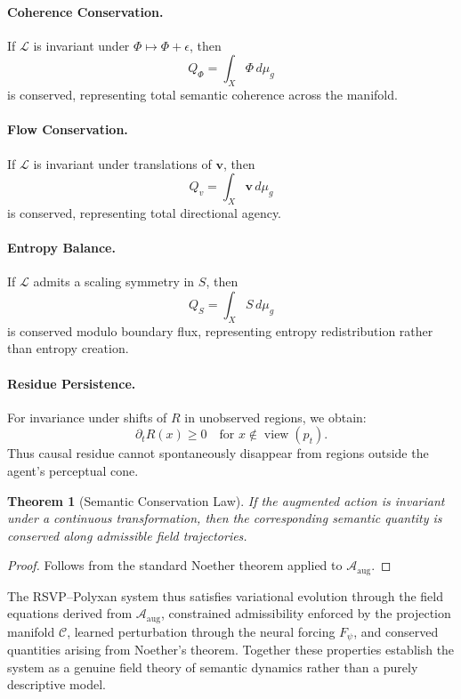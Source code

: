 \documentclass[11pt]{article}
\newtheorem{theorem}{Theorem}[section]
\begin{document}
\paragraph{Coherence Conservation.}
If $\mathcal{L}$ is invariant under $\Phi \mapsto \Phi + \epsilon$, then
\[
Q_\Phi = \int_X \Phi\, d\mu_g
\]
is conserved, representing total semantic coherence across the manifold.

\paragraph{Flow Conservation.}
If $\mathcal{L}$ is invariant under translations of $\mathbf{v}$, then
\[
Q_v = \int_X \mathbf{v}\, d\mu_g
\]
is conserved, representing total directional agency.

\paragraph{Entropy Balance.}
If $\mathcal{L}$ admits a scaling symmetry in $S$, then
\[
Q_S = \int_X S\, d\mu_g
\]
is conserved modulo boundary flux, representing entropy redistribution
rather than entropy creation.

\paragraph{Residue Persistence.}
For invariance under shifts of $R$ in unobserved regions, we obtain:
\[
\partial_t R(x) \ge 0 \quad \text{for } x \notin \operatorname{view}(p_t).
\]
Thus causal residue cannot spontaneously disappear from regions outside the
agent's perceptual cone.

\begin{theorem}[Semantic Conservation Law]
If the augmented action is invariant under a continuous transformation,
then the corresponding semantic quantity is conserved along admissible
field trajectories.
\end{theorem}

\begin{proof}
Follows from the standard Noether theorem applied to
$\mathcal{A}_{\text{aug}}$.
\end{proof}

The RSVP--Polyxan system thus satisfies variational evolution through
the field equations derived from $\mathcal{A}_{\text{aug}}$, constrained
admissibility enforced by the projection manifold $\mathcal{C}$, learned
perturbation through the neural forcing $F_\psi$, and conserved quantities
arising from Noether's theorem.
Together these properties establish the system as a genuine field theory
of semantic dynamics rather than a purely descriptive model.
\end{document}
